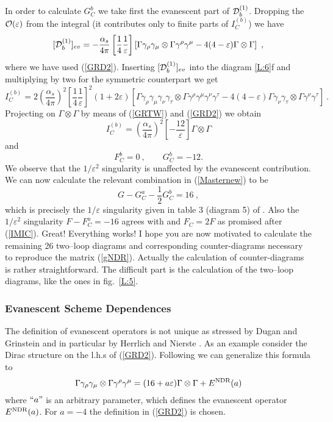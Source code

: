 \documentclass[12pt,rotate]{article}
\def\as{\alpha_s}
\newcommand{\be}{\begin{equation}}
\newcommand{\ee}{\end{equation}}
\newcommand{\ord}{{\cal O}}
\begin{document}
\begin{itemize}
\begin{itemize}
In order to calculate $G^b_C$ we take first the evanescent part
of ${\cal D}^{(1)}_b$. Dropping the $\ord(\varepsilon)$ from
the integral (it contributes only to finite parts of $I^{(b)}_C$) we have
\be\label{DS7}
[{\cal D}^{(1)}_b]_{ev}=-\frac{\as}{4\pi}
\left[\frac{1}{4}\frac{1}{\varepsilon}\right]
\left[\Gamma\gamma_\rho\gamma_\mu\otimes\Gamma\gamma^\rho\gamma^\mu
-4 (4-\varepsilon)\Gamma\otimes\Gamma\right]~,
\ee
where we have used (\ref{GRD2}). Inserting $[{\cal D}^{(1)}_b]_{ev}$
into the diagram \ref{L:6}f and multiplying by two for the symmetric
counterpart we get
\be\label{DS8}
I^{(b)}_C=2
\left(\frac{\as}{4\pi}\right)^2
\left[\frac{1}{4}\frac{1}{\varepsilon}\right]^2
(1+2\varepsilon)
\left[
\Gamma\gamma_\rho\gamma_\mu\gamma_\nu\gamma_\tau
\otimes\Gamma\gamma^\rho\gamma^\mu\gamma^\nu\gamma^\tau
-4 (4-\varepsilon)\Gamma\gamma_\nu\gamma_\tau\otimes
\Gamma\gamma^\nu\gamma^\tau\right]~.
\ee
Projecting on $\Gamma\otimes\Gamma$ by means of (\ref{GRTW}) and
(\ref{GRD2}) we obtain
\be\label{DS9}
I^{(b)}_C=\left(\frac{\as}{4\pi}\right)^2
\left[-\frac{12}{\varepsilon}\right]
\Gamma\otimes\Gamma
\ee
and
\be
F^b_C=0~, \quad\quad G^b_C=-12.
\ee
We observe that the $1/\varepsilon^2$ singularity is unaffected by
the evanescent contribution. We can now calculate the relevant
combination in (\ref{Masternew}) to be
\be\label{MaNe}
G-G^a_C-\frac{1}{2}G^b_C=16~,
\ee
which is precisely the $1/\varepsilon$ singularity given in table 3
(diagram 5) of \cite{WEISZ}. Also the $1/\varepsilon^2$ singularity
$F-F^a_C=-16$ agrees with \cite{WEISZ} and $F_C=2F$ as promised
after (\ref{IMIC}). Great! Everything works! I hope you are now
motivated to calculate the remaining 26 two--loop diagrams and
corresponding counter-diagrams necessary to reproduce the
matrix (\ref{gNDR}). Actually the calculation of counter-diagrams
is rather straightforward. The difficult part is the calculation
of the two--loop diagrams, like the ones in fig.~\ref{L:5}. 
\subsubsection{Evanescent Scheme Dependences}
The definition of evanescent operators is not unique as stressed
by Dugan and Grinstein \cite{DuGr} 
and in particular by Herrlich and Nierste \cite{HNE}. As an example
consider the Dirac structure  on the l.h.s of (\ref{GRD2}).
Following \cite{HNE} we can generalize this formula to
\be\label{GEVE}
\Gamma\gamma_\rho\gamma_\mu\otimes\Gamma\gamma^\rho\gamma^\mu 
=(16+a\varepsilon) \Gamma\otimes\Gamma+E^{\rm NDR}(a)
\ee
where $ ``a"$ is an arbitrary parameter, which defines the evanescent
operator $E^{\rm NDR}(a)$. For $a=-4$ the definition in (\ref{GRD2})
is chosen.


\end{itemize}
\end{itemize}
\end{document}
